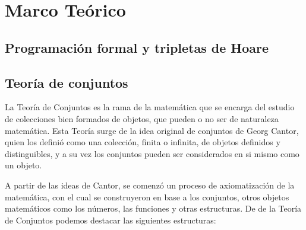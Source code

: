 \chapter{Marco Teórico}
\label{capitulo1}

\section{Programación formal y tripletas de Hoare}

\section{Teoría de conjuntos}

La Teoría de Conjuntos es la rama de la matemática que se encarga del estudio
de colecciones bien formados de objetos, que pueden o no ser de naturaleza
matemática. Esta Teoría surge de la idea original de conjuntos de Georg
Cantor, quien los definió como una colección, finita o infinita, de objetos
definidos y distinguibles, y a su vez los conjuntos pueden ser
considerados en si mismo como un objeto.

A partir de las ideas de Cantor, se comenzó un proceso de axiomatización de la
matemática, con el cual se construyeron en base a los conjuntos, otros objetos
matemáticos como los números, las funciones y otras estructuras. De
de la Teoría de Conjuntos podemos destacar las siguientes estructuras:

